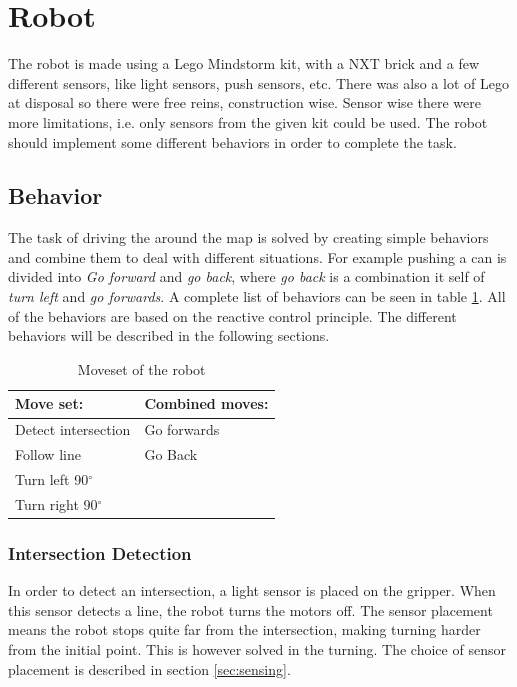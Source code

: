 \section{Robot} 

The robot is made using a Lego Mindstorm kit, with a NXT brick and a few different sensors, like light sensors, push sensors, etc. There was also a lot of Lego at disposal so there were free reins, construction wise. Sensor wise there were more limitations, i.e. only sensors from the given kit could be used. The robot should implement some different behaviors in order to complete the task.

\subsection{Behavior} \label{sec:behavior}
The task of driving the around the map is solved by creating simple behaviors and combine them to deal with different situations. For example pushing a can is divided into \textit{Go forward} and \textit{go back}, where \textit{go back} is a combination it self of \textit{turn left} and \textit{go forwards}. A complete list of behaviors can be seen in table \ref{tab:movset}. All of the behaviors are based on the reactive control principle. The different behaviors will be described in the following sections.

\begin{table}[H]
\centering
 \begin{tabular}{|l|l|}
  \hline
  Move set: &  Combined moves: \\
  \hline
   Detect intersection & Go forwards\\
   Follow line & Go Back\\
   Turn left 90$^{\circ}$  &\\
   Turn right 90$^{\circ}$ & \\
   \hline
 \end{tabular}
\caption{Moveset of the robot}
\label{tab:movset}
\end{table}

\subsubsection{Intersection Detection}
In order to detect an intersection, a light sensor is placed on the gripper. When this sensor detects a line, the robot turns the motors off. 
The sensor placement means the robot stops quite far from the intersection, making turning harder from the initial point.
This is however solved in the turning.
The choice of sensor placement is described in section \ref{sec:sensing}.

